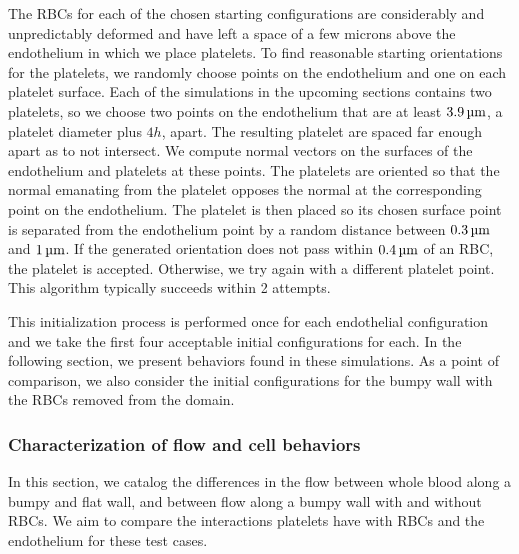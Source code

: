 The RBCs for each of the chosen starting configurations are considerably and
unpredictably deformed and have left a space of a few microns above the endothelium
in which we place platelets. To find reasonable starting orientations for the platelets,
we randomly choose points on the endothelium and one on each platelet surface. Each of
the simulations in the upcoming sections contains two platelets, so we choose two points
on the endothelium that are at least $3.9\um$, a platelet diameter plus $4h$, apart. The
resulting platelet are spaced far enough apart as to not intersect. We compute normal
vectors on the surfaces of the endothelium and platelets at these points. The platelets
are oriented so that the normal emanating from the platelet opposes the normal at the
corresponding point on the endothelium. The platelet is then placed so its chosen surface
point is separated from the endothelium point by a random distance between $0.3\um$ and
$1\um$. If the generated orientation does not pass within $0.4\um$ of an RBC, the
platelet is accepted. Otherwise, we try again with a different platelet point. This
algorithm typically succeeds within 2 attempts.

This initialization process is performed once for each endothelial configuration and we
take the first four acceptable initial configurations for each. In the following section,
we present behaviors found in these simulations. As a point of comparison, we also
consider the initial configurations for the bumpy wall with the RBCs removed from the
domain.


\subsubsection{Characterization of flow and cell behaviors}

In this section, we catalog the differences in the flow between whole blood along a bumpy
and flat wall, and between flow along a bumpy wall with and without RBCs. We aim to
compare the interactions platelets have with RBCs and the endothelium for these test
cases.

